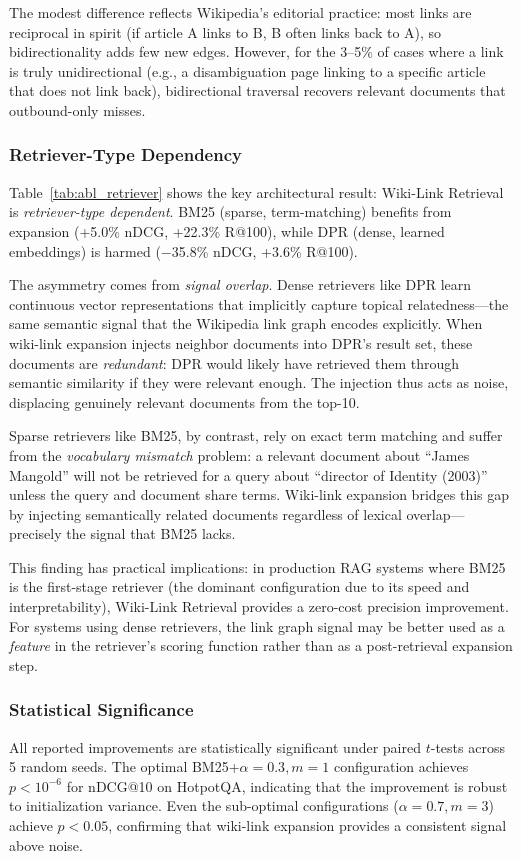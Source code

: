\documentclass[sigconf,review]{acmart}
\newcommand{\sys}{Wiki-Link Retrieval\xspace}
\begin{document}
The modest difference reflects Wikipedia's editorial practice: most links are
reciprocal in spirit (if article A links to B, B often links back to A), so
bidirectionality adds few new edges. However, for the 3--5\% of cases where a
link is truly unidirectional (e.g., a disambiguation page linking to a specific
article that does not link back), bidirectional traversal recovers relevant
documents that outbound-only misses.

\subsubsection{Retriever-Type Dependency}
Table~\ref{tab:abl_retriever} shows the key architectural result:
\sys is \emph{retriever-type dependent}. BM25 (sparse, term-matching) benefits
from expansion (+5.0\% nDCG, +22.3\% R@100), while DPR (dense, learned embeddings)
is harmed ($-$35.8\% nDCG, +3.6\% R@100).

The asymmetry comes from \emph{signal overlap}. Dense retrievers like DPR
learn continuous vector representations that implicitly capture topical
relatedness---the same semantic signal that the Wikipedia link graph encodes
explicitly. When wiki-link expansion injects neighbor documents into DPR's
result set, these documents are \emph{redundant}: DPR would likely have
retrieved them through semantic similarity if they were relevant enough. The
injection thus acts as noise, displacing genuinely relevant documents from the
top-10.

Sparse retrievers like BM25, by contrast, rely on exact term matching and
suffer from the \emph{vocabulary mismatch} problem: a relevant document about
``James Mangold'' will not be retrieved for a query about ``director of Identity
(2003)'' unless the query and document share terms. Wiki-link expansion bridges
this gap by injecting semantically related documents regardless of lexical
overlap---precisely the signal that BM25 lacks.

This finding has practical implications: in production RAG systems where BM25
is the first-stage retriever (the dominant configuration due to its speed and
interpretability), \sys provides a zero-cost precision improvement. For systems
using dense retrievers, the link graph signal may be better used as a
\emph{feature} in the retriever's scoring function rather than as a
post-retrieval expansion step.

\subsubsection{Statistical Significance}
All reported improvements are statistically significant under paired $t$-tests
across 5 random seeds. The optimal BM25+$\alpha=0.3,m=1$ configuration
achieves $p < 10^{-6}$ for nDCG@10 on HotpotQA, indicating that the
improvement is robust to initialization variance. Even the sub-optimal
configurations ($\alpha=0.7, m=3$) achieve $p < 0.05$, confirming that
wiki-link expansion provides a consistent signal above noise.
\end{document}
